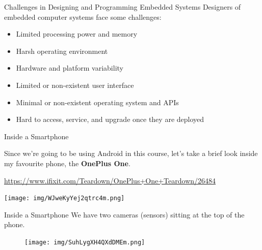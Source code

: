 \documentclass[aspectratio=169]{beamer}
\begin{document}
\begin{frame}{Challenges in Designing and Programming Embedded Systems}
Designers of embedded computer systems face some challenges: \\
\begin{itemize}
\item Limited processing power and memory
\item Harsh operating environment
\item Hardware and platform variability
\item Limited or non-existent user interface
\item Minimal or non-existent operating system and APIs
\item Hard to access, service, and upgrade once they are deployed
\end{itemize}
\end{frame}



	\begin{frame}{Inside a Smartphone}
		
		Since we're going to be using Android in this course, let's take a brief look
		inside my favourite phone, the {\bf OnePlus One}.
		
		\href{https://www.ifixit.com/Teardown/OnePlus+One+Teardown/26484}{https://www.ifixit.com/Teardown/OnePlus+One+Teardown/26484}
		
		\vspace{1em}		
		
		\centering
		\texttt{[image: img/WJweKyYej2qtrc4m.png]}
			
	\end{frame}



	\begin{frame}{Inside a Smartphone}
		We have two cameras (sensors) sitting at the top of the phone.
		\begin{figure}[b]		
		\centering
		\texttt{[image: img/SuhLygXH4QXdDMEm.png]}
		\end{figure}
	\end{frame}
\end{document}
